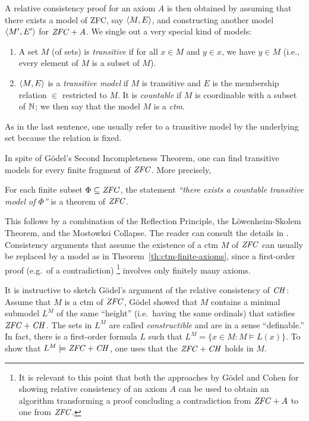 A relative consistency proof for an axiom $A$ is then obtained by
assuming that there exists a model of ZFC, say $\langle M,E\rangle$, and
constructing another model $\langle M',E'\rangle$ for $\mathit{ZFC} + A$. We single
out a very special kind of models:
%
\begin{definition}\label{def:transitive-model}
  \begin{enumerate}
  \item A set $M$ (of sets) is \emph{transitive} if for all $x\in M$ and 
 $y\in x$, we have $y\in M$ (i.e., every element of $M$ is a subset
 of $M$).
  \item $\langle M,E\rangle$ is a \emph{transitive model} if $M$ is transitive
  and  $E$ is the membership relation $\in$ restricted to
 $M$. It is \emph{countable} if $M$ is coordinable with a subset of
 $\mathbb{N}$; we then say that the model  $M$ is a \emph{ctm}. 
  \end{enumerate}
\end{definition}
%
\noindent As in the last sentence, one usually refer to a transitive
model by the underlying set because the relation is fixed.
%
%

%
%
In spite of G\"odel's Second Incompleteness Theorem, one can find
transitive models for every finite fragment of $\mathit{ZFC}$. More precisely,
%
\begin{theorem}\label{th:ctm-finite-axioms}
  For each finite subset
  $\Phi\subseteq \mathit{ZFC}$, the statement \emph{``there exists a countable
 transitive model of $\Phi$''} is a theorem of $\mathit{ZFC}$.
\end{theorem}
%
\noindent This follows by a combination of the Reflection Principle, the
L\"owenheim-Skolem Theorem, and the Mostowksi Collapse. The reader can
consult the details in \cite{kunen2011set}. Consistency arguments that
assume the existence of a ctm $M$ of $\mathit{ZFC}$ can usually be replaced by
a model as in Theorem~\ref{th:ctm-finite-axioms}, since a first-order
proof (e.g.\ of a contradiction)%
%
\footnote{It is relevant to this point that 
  both the approaches by G\"odel and Cohen for showing
  relative consistency of an axiom $A$ 
  can be used to obtain an algorithm transforming a proof
  concluding a contradiction from $\mathit{ZFC}+A$ to one from $\mathit{ZFC}$.}
%
involves only finitely many axioms.

It is instructive to sketch G\"odel's argument of the relative
consistency of $\mathit{CH}$: Assume that $M$ is a ctm of $\mathit{ZFC}$, G\"odel
showed that $M$ contains a minimal submodel $L^M$ of the same
``height'' (i.e.\ having the same ordinals) that satisfies
$\mathit{ZFC}+\mathit{CH}$. The sets in $L^M$ are called \emph{constructible} and are
in a sense ``definable.'' In fact, there is a first-order formula $L$
such that $L^M = \{x\in M : M\models L(x)\}$. To show that
$L^M\models \mathit{ZFC}+\mathit{CH}$, one uses that the $\mathit{ZFC}+\mathit{CH}$ holds in $M$.

